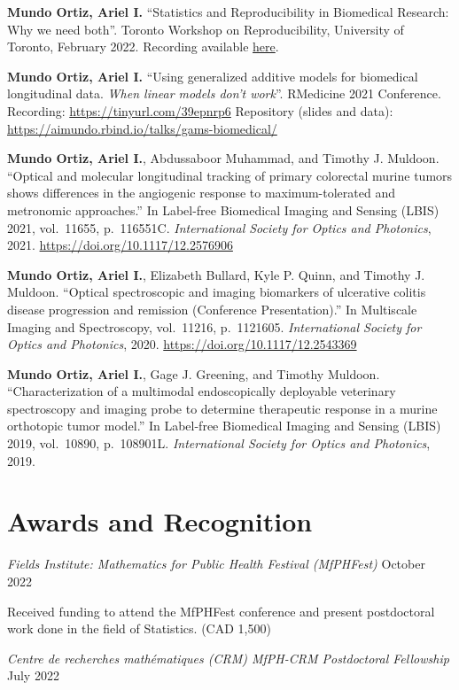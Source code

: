 \documentclass[10pt,]{article}
\begin{document}
\textbf{Mundo Ortiz, Ariel I.} ``Statistics and Reproducibility in
Biomedical Research: Why we need both''. Toronto Workshop on
Reproducibility, University of Toronto, February 2022. Recording
available \href{https://www.youtube.com/watch?v=Fvkp20X5xwA}{here}.

\textbf{Mundo Ortiz, Ariel I.} ``Using generalized additive models for
biomedical longitudinal data. \emph{When linear models don't work}''.
RMedicine 2021 Conference. Recording: \url{https://tinyurl.com/39epnrp6}
Repository (slides and data):
\url{https://aimundo.rbind.io/talks/gams-biomedical/}

\textbf{Mundo Ortiz, Ariel I.}, Abdussaboor Muhammad, and Timothy J.
Muldoon. ``Optical and molecular longitudinal tracking of primary
colorectal murine tumors shows differences in the angiogenic response to
maximum-tolerated and metronomic approaches.'' In Label-free Biomedical
Imaging and Sensing (LBIS) 2021, vol.~11655, p.~116551C.
\emph{International Society for Optics and Photonics}, 2021.
\url{https://doi.org/10.1117/12.2576906}

\textbf{Mundo Ortiz, Ariel I.}, Elizabeth Bullard, Kyle P. Quinn, and
Timothy J. Muldoon. ``Optical spectroscopic and imaging biomarkers of
ulcerative colitis disease progression and remission (Conference
Presentation).'' In Multiscale Imaging and Spectroscopy, vol.~11216,
p.~1121605. \emph{International Society for Optics and Photonics}, 2020.
\url{https://doi.org/10.1117/12.2543369}

\textbf{Mundo Ortiz, Ariel I.}, Gage J. Greening, and Timothy Muldoon.
``Characterization of a multimodal endoscopically deployable veterinary
spectroscopy and imaging probe to determine therapeutic response in a
murine orthotopic tumor model.'' In Label-free Biomedical Imaging and
Sensing (LBIS) 2019, vol.~10890, p.~108901L. \emph{International Society
for Optics and Photonics}, 2019.

\section{Awards and Recognition}\label{awards-and-recognition}

\emph{Fields Institute: Mathematics for Public Health Festival
(MfPHFest)} \hfill October 2022

Received funding to attend the MfPHFest conference and present
postdoctoral work done in the field of Statistics. (CAD 1,500)

\emph{Centre de recherches mathématiques (CRM) MfPH-CRM Postdoctoral
Fellowship} \hfill July 2022
\end{document}
